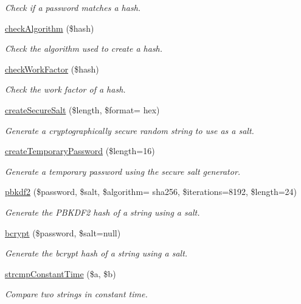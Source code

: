 \begin{DoxyCompactItemize}
\begin{DoxyCompactList}\small\item\em Check if a password matches a hash. \end{DoxyCompactList}\item 
\hyperlink{classPassword_a9bcd6f8ec84385ed4973e4bef05ecbea}{check\+Algorithm} (\$hash)
\begin{DoxyCompactList}\small\item\em Check the algorithm used to create a hash. \end{DoxyCompactList}\item 
\hyperlink{classPassword_aba9bca7cad134de9f4895852523ebec1}{check\+Work\+Factor} (\$hash)
\begin{DoxyCompactList}\small\item\em Check the work factor of a hash. \end{DoxyCompactList}\item 
\hyperlink{classPassword_a76fa768628b67c0f841b2c9acab9d678}{create\+Secure\+Salt} (\$length, \$format= \textquotesingle{}hex\textquotesingle{})
\begin{DoxyCompactList}\small\item\em Generate a cryptographically secure random string to use as a salt. \end{DoxyCompactList}\item 
\hyperlink{classPassword_aef378e672d57dbe203242230c3cc45a9}{create\+Temporary\+Password} (\$length=16)
\begin{DoxyCompactList}\small\item\em Generate a temporary password using the secure salt generator. \end{DoxyCompactList}\item 
\hyperlink{classPassword_ac87ffce0f03ab9b36287a22d1d70162d}{pbkdf2} (\$password, \$salt, \$algorithm= \textquotesingle{}sha256\textquotesingle{}, \$iterations=8192, \$length=24)
\begin{DoxyCompactList}\small\item\em Generate the P\+B\+K\+D\+F2 hash of a string using a salt. \end{DoxyCompactList}\item 
\hyperlink{classPassword_a097e73abceaf4b976c92471f9b4a2cab}{bcrypt} (\$password, \$salt=null)
\begin{DoxyCompactList}\small\item\em Generate the bcrypt hash of a string using a salt. \end{DoxyCompactList}\item 
\hyperlink{classPassword_a56edcc9dc50a2dc82886e943de17786b}{strcmp\+Constant\+Time} (\$a, \$b)
\begin{DoxyCompactList}\small\item\em Compare two strings in constant time. \end{DoxyCompactList}\end{DoxyCompactItemize}


